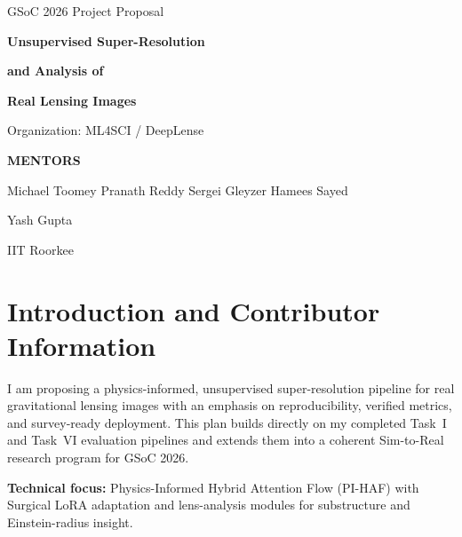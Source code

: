 \documentclass[11pt,a4paper]{article}
\begin{document}

\begin{titlepage}
\thispagestyle{empty}
\centering
\vspace*{2.0cm}
{\Large GSoC 2026 Project Proposal\par}
\vspace{2.0cm}
{\Huge\bfseries Unsupervised Super-Resolution\par}
\vspace{0.2cm}
{\Huge\bfseries and Analysis of\par}
\vspace{0.2cm}
{\Huge\bfseries Real Lensing Images\par}
\vspace{1.6cm}
{\Large Organization: ML4SCI / DeepLense\par}
\vfill
{\Large\bfseries MENTORS\par}
\vspace{0.5cm}
{\large Michael Toomey \quad Pranath Reddy \quad Sergei Gleyzer \quad Hamees Sayed\par}
\vfill
{\large Yash Gupta\par}
{\normalsize IIT Roorkee\par}
\vspace*{1.0cm}
\end{titlepage}
\clearpage

\setcounter{page}{1}
\tableofcontents
\clearpage

\setcounter{page}{1}
\pagestyle{fancy}

\section{Introduction and Contributor Information}

I am proposing a physics-informed, unsupervised super-resolution pipeline for real gravitational lensing images with an emphasis on reproducibility, verified metrics, and survey-ready deployment. This plan builds directly on my completed Task~I and Task~VI evaluation pipelines and extends them into a coherent Sim-to-Real research program for GSoC 2026.

\textbf{Technical focus:} Physics-Informed Hybrid Attention Flow (PI-HAF) with Surgical LoRA adaptation and lens-analysis modules for substructure and Einstein-radius insight.
\end{document}

